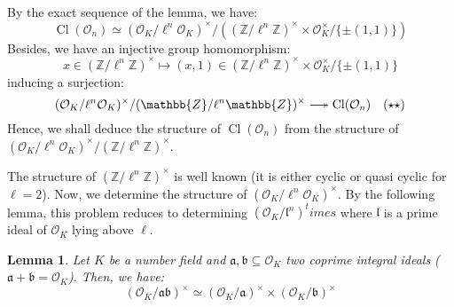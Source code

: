 \documentclass[a4paper,10pt]{report}
\theoremstyle{definition}
\theoremstyle{plain}
\newtheorem{lemma}[definition]{Lemma}
\theoremstyle{definition}
\newcommand{\Z}{\mathbb{Z}}
\newcommand{\mO}{\mathcal{O}}
\renewcommand{\(}{\left(}
\renewcommand{\)}{\right)}
\newcommand{\mf}[1]{\mathfrak{#1}}
\DeclareMathOperator{\Cl}{Cl}
\begin{document}
By the exact sequence of the lemma, we have:
\[\Cl(\mO_n)\simeq (\mO_K/\ell^n\mO_K)^\times/((\Z/\ell^n\Z)^\times\times \mO_K^\times/\{\pm(1,1)\})\]
Besides, we have an injective group homomorphism:
\[x\in(\Z/\ell^n\Z)^\times\longmapsto (x,1)\in (\Z/\ell^n\Z)^\times\times \mO_K^\times/\{\pm(1,1)\} \]
inducing a surjection:
\[(\mO_K/\ell^n\mO_K)^\times/(\Z/\ell^n\Z)^\times\relbar\joinrel\twoheadrightarrow \Cl(\mO_n) \quad (\star\star)\]
Hence, we shall deduce the structure of $\Cl(\mO_n)$ from the structure of $(\mO_K/\ell^n\mO_K)^\times/(\Z/\ell^n\Z)^\times$.

The structure of $(\Z/\ell^n\Z)^\times$ is well known (it is either cyclic or quasi cyclic for $\ell=2$). Now, we determine the structure of $(\mO_K/\ell^n\mO_K)^\times$. By the following lemma, this problem reduces to determining $(\mO_K/\mf{l}^n)^times$ where $\mf{l}$ is a prime ideal of $\mO_K$ lying above $\ell$.

\begin{lemma}\label{lemma 14}
Let $K$ be a number field and $\mf{a}, \mf{b}\subseteq \mO_K$ two coprime integral ideals ($\mf{a}+\mf{b}=\mO_K$). Then, we have:
\[(\mO_K/\mf{a}\mf{b})^\times\simeq(\mO_K/\mf{a})^\times\times(\mO_K/\mf{b})^\times\] 
\end{lemma}
\end{document}
